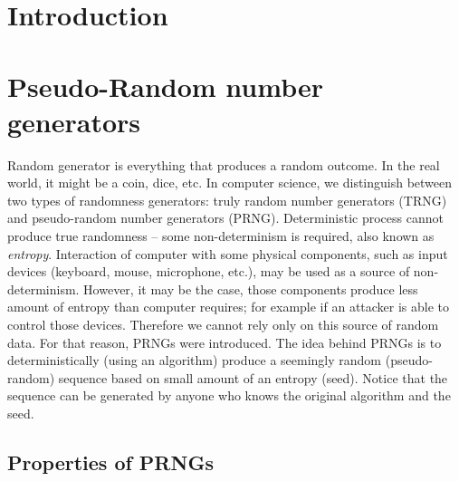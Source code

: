 \documentclass[
    digital,    %
    oneside,    %
    color,
    11pt,
    nocover,
    notable,
    nolof,
    nolot,
    final
]{fithesis3}
\renewcommand\_{\textunderscore\allowbreak}
\begin{document}
\setlength{\parskip}{5pt}
\setlength{\parindent}{0pt}

\newtheorem{theorem}{Theorem}[section] %
                               
\newtheorem{formula}[theorem]{Formula}     %

\chapter{Introduction}
\label{chap:introduction}


\chapter{Pseudo-Random number generators}

Random generator is everything that produces a random outcome. In the real world, it might be a coin, dice, etc. In computer science, we distinguish between two types of randomness generators: truly random number generators (TRNG) and pseudo-random number generators (PRNG). Deterministic process cannot produce true randomness -- some non-determinism is required, also known as \textit{entropy}. Interaction of computer with some physical components, such as input devices (keyboard, mouse, microphone, etc.), may be used as a source of non-determinism. However, it may be the case, those components produce less amount of entropy than computer requires; for example if an attacker is able to control those devices. Therefore we cannot rely only on this source of random data. For that reason, PRNGs were introduced. The idea behind PRNGs is to deterministically (using an algorithm) produce a seemingly random (pseudo-random) sequence based on small amount of an entropy (seed). Notice that the sequence can be generated by anyone who knows the original algorithm and the seed. \cite{jakobsson2014theory}

\section{Properties of PRNGs}
\end{document}
